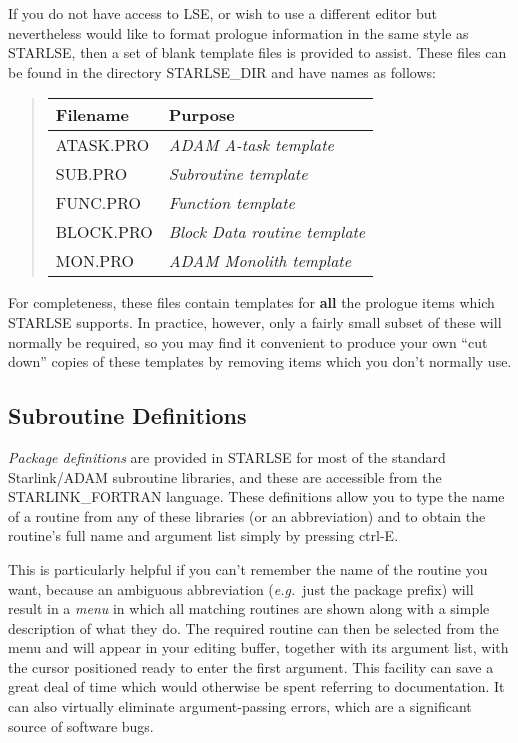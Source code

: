 If you do not have access to \mbox{LSE}, or wish to use a different editor
but nevertheless would like to format prologue information in the same style 
as \mbox{STARLSE}, then a set of blank template files is provided to 
assist.
These files can be found in the directory \mbox{STARLSE\_DIR} and have names
as follows: 

\begin{quote}
\begin{center}
\begin{tabular}{|l|l|}
\hline
{\bf Filename} & {\bf Purpose} \\
\hline \hline
ATASK.PRO & {\em ADAM A-task template} \\
SUB.PRO & {\em Subroutine template} \\
FUNC.PRO & {\em Function template} \\
BLOCK.PRO & {\em Block Data routine template} \\
MON.PRO & {\em ADAM Monolith template} \\
\hline
\end{tabular}
\end{center}
\end{quote}

For completeness, these files contain templates for {\bf all} the prologue
items which \mbox{STARLSE} supports. 
In practice, however, only a fairly small subset of these will normally be
required, so you may find it convenient to produce your own ``cut down''
copies of these templates by removing items which you don't normally use. 


\subsection{Subroutine Definitions}

{\em Package definitions} are provided in \mbox{STARLSE} for most of the
standard Starlink/\mbox{ADAM} subroutine libraries, and these are accessible
from the \mbox{STARLINK\_FORTRAN} language. 
These definitions allow you to type the name of a routine from any of these
libraries (or an abbreviation) and to obtain the routine's full name and
argument list simply by pressing \mbox{ctrl-E}. 

This is particularly helpful if you can't remember the name of the routine 
you want, because an ambiguous abbreviation ({\em e.g.}\ just the package
prefix) will result in a {\em menu} in which all matching routines are shown
along with a simple description of what they do. 
The required routine can then be selected from the menu and will appear in
your editing buffer, together with its argument list, with the cursor
positioned ready to enter the first argument. 
This facility can save a great deal of time which would otherwise be spent
referring to documentation. 
It can also virtually eliminate argument-passing errors, which are a
significant source of software bugs. 

